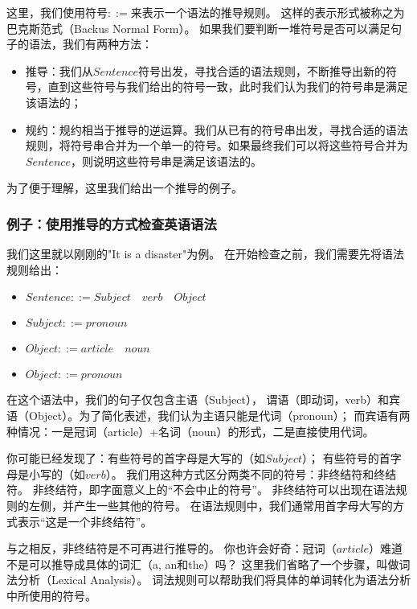 \documentclass[../main.tex]{subfiles}
\begin{document}
  \indent 这里，我们使用符号$::=$来表示一个语法的推导规则。
  这样的表示形式被称之为巴克斯范式（Backus Normal Form）。\cite{bnfwiki}
  如果我们要判断一堆符号是否可以满足句子的语法，我们有两种方法：

  \begin{itemize}
    \item 推导：我们从$Sentence$符号出发，寻找合适的语法规则，不断推导出新的符号，直到这些符号与我们给出的符号一致，此时我们认为我们的符号串是满足该语法的；
    \item 规约：规约相当于推导的逆运算。我们从已有的符号串出发，寻找合适的语法规则，将符号串合并为一个单一的符号。如果最终我们可以将这些符号合并为$Sentence$，则说明这些符号串是满足该语法的。
  \end{itemize}

  \indent 为了便于理解，这里我们给出一个推导的例子。

  \subsubsection*{例子：使用推导的方式检查英语语法}
    \indent 我们这里就以刚刚的"It is a disaster"为例。
    在开始检查之前，我们需要先将语法规则给出：

    \begin{itemize}
      \item $Sentence ::= Subject\quad verb\quad Object$
      \item $Subject ::= pronoun$
      \item $Object ::= article\quad noun$
      \item $Object ::= pronoun$
    \end{itemize}

    \indent 在这个语法中，我们的句子仅包含主语（Subject），
    谓语（即动词，verb）和宾语（Object）。为了简化表述，我们认为主语只能是代词（pronoun）；
    而宾语有两种情况：一是冠词（article）+名词（noun）的形式，二是直接使用代词。

    \indent 你可能已经发现了：有些符号的首字母是大写的（如$Subject$）；
    有些符号的首字母是小写的（如$verb$）。
    我们用这种方式区分两类不同的符号：非终结符和终结符。
    非终结符，即字面意义上的“不会中止的符号”。
    非终结符可以出现在语法规则的左侧，并产生一些其他的符号。
    在语法规则中，我们通常用首字母大写的方式表示“这是一个非终结符”。

    \indent 与之相反，非终结符是不可再进行推导的。
    你也许会好奇：冠词（$article$）难道不是可以推导成具体的词汇（a, an和the）吗？
    这里我们省略了一个步骤，叫做词法分析（Lexical Analysis）。
    词法规则可以帮助我们将具体的单词转化为语法分析中所使用的符号。
\end{document}

